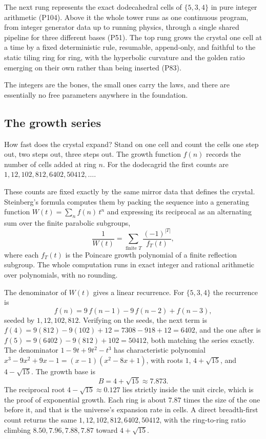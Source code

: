 The next rung represents the exact dodecahedral cells of
$\{5,3,4\}$ in pure integer arithmetic (P104). Above it the whole tower runs as one continuous program, from
integer generator data up to running physics, through a single shared pipeline for three different bases
(P51). The top rung grows the crystal one cell at a time by a fixed deterministic rule, resumable,
append-only, and faithful to the static tiling ring for ring, with the hyperbolic curvature and the golden
ratio emerging on their own rather than being inserted (P83).

The integers are the bones, the small ones
carry the laws, and there are essentially no free parameters anywhere in the foundation.

\subsection{The growth series}

How fast does the crystal expand? Stand on one cell and count the cells one step out, two steps out, three
steps out. The growth function $f(n)$ records the number of cells added at ring $n$. For the dodecagrid the
first counts are $1, 12, 102, 812, 6402, 50412, \dots$.

These counts are fixed exactly by the same mirror
data that defines the crystal. Steinberg's formula computes them by packing the sequence into a generating
function $W(t) = \sum_n f(n)\, t^n$ and expressing its reciprocal as an alternating sum over the finite
parabolic subgroups,
\begin{equation}
  \frac{1}{W(t)} = \sum_{\text{finite } T} \frac{(-1)^{|T|}}{f_T(t)},
\end{equation}
where each $f_T(t)$ is the Poincare growth polynomial of a finite reflection subgroup. The whole computation
runs in exact integer and rational arithmetic over polynomials, with no rounding.

The denominator of $W(t)$
gives a linear recurrence. For $\{5,3,4\}$ the recurrence is
\begin{equation}
  f(n) = 9\, f(n-1) - 9\, f(n-2) + f(n-3),
\end{equation}
seeded by $1, 12, 102, 812$. Verifying on the seeds, the next term is
$f(4) = 9(812) - 9(102) + 12 = 7308 - 918 + 12 = 6402$, and the one after is
$f(5) = 9(6402) - 9(812) + 102 = 50412$, both matching the series exactly. The denominator $1 - 9t + 9t^2 -
t^3$ has characteristic polynomial $x^3 - 9x^2 + 9x - 1 = (x-1)(x^2 - 8x + 1)$, with roots $1$, $4 +
\sqrt{15}$, and $4 - \sqrt{15}$. The growth base is
\begin{equation}
  B = 4 + \sqrt{15} \approx 7.873.
\end{equation}
The reciprocal root $4 - \sqrt{15} \approx 0.127$ lies strictly inside the unit circle, which is the proof of
exponential growth. Each ring is about $7.87$ times the size of the one before it, and that is the universe's
expansion rate in cells. A direct breadth-first count returns the same $1, 12, 102, 812, 6402, 50412$, with
the ring-to-ring ratio climbing $8.50, 7.96, 7.88, 7.87$ toward $4 + \sqrt{15}$.


